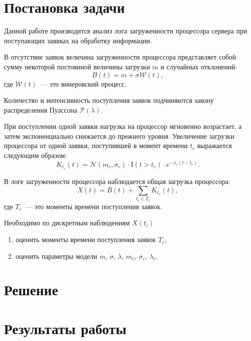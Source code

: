 \documentclass[a4paper,10pt]{article}
\begin{document}



\section{Постановка задачи}
Данной работе производится анализ лога загруженности процессора сервера
при поступающих заявках на обработку информации.

В отсутствие заявок величина загруженности процессора представляет собой 
сумму некоторой постоянной величины загрузки $m$ и случайных отклонений:
$$B(t) = m + \sigma \mathcal{W}(t),$$
где $\mathcal{W}(t)$~--- это винеровский процесс.

Количество и интенсивность поступления заявок подчиняются закону
распределения Пуассона $\mathcal{P}(\lambda)$.

При поступлении одной заявки нагрузка на процессор мгновенно возрастает,
а затем экспоненциально снижается до прежнего уровня.
Увеличение загрузки процессора от одной заявки, 
поступившей в момент времени $t_c$ выражается следующим образом:
$$K_{t_c}(t) = \mathcal{N}(m_c, \sigma_c) \cdot \mathrm{I}(t > t_c) \cdot 
    e^{-\lambda_c(t - t_c)}.$$

В логе загруженности процессора наблюдается общая загрузка процессора:
$$X(t) = B(t) + \sum\limits_{t_c \in T_c}K_{t_c}(t),$$
где $T_c$~--- это моменты времени поступления заявок.

Необходимо по дискретным наблюдениям $X(t_i)$
\begin{enumerate}
 \item оценить моменты времени поступления заявок $T_c$,
 \item оценить параметры модели $m$, $\sigma$, $\lambda$, $m_c$, 
 $\sigma_c$, $\lambda_c$.
\end{enumerate}

\cite{ivchmed2010matstat}

\section{Решение}

\section{Результаты работы}




\pagebreak



\end{document}
